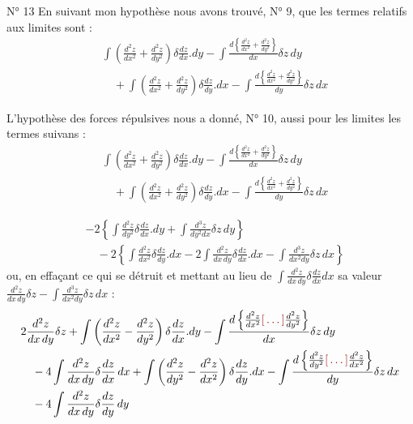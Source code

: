 \documentclass[11pt,a4paper]{article}
\begin{document}
N° 13 En suivant mon hypothèse nous avons trouvé, N° 9, que les termes
relatifs aux limites sont :
\begin{align*}
  &\int \left( \frac{d^{2}z}{dx^{2}} + \frac{d^{2}z}{dy^{2}} \right)
      \delta\frac{dz}{dx} . dy
   - \int \frac{d\left\{ \frac{d^{2}z}{dx^{2}} + \frac{d^{2}z}{dy^{2}} \right\}}{dx}
      \delta z\, dy \\
  &\quad + \int \left( \frac{d^{2}z}{dx^{2}} + \frac{d^{2}z}{dy^{2}} \right)
      \delta\frac{dz}{dy} . dx
   - \int \frac{d\left\{ \frac{d^{2}z}{dx^{2}} + \frac{d^{2}z}{dy^{2}} \right\}}{dy}
      \delta z\, dx
\end{align*}

L'hypothèse des forces répulsives nous a donné, N° 10, aussi pour les limites
les termes suivans :
\begin{align*}
  &\int \left( \frac{d^{2}z}{dx^{2}} + \frac{d^{2}z}{dy^{2}} \right)
      \delta\frac{dz}{dx} . dy
   - \int \frac{d\left\{ \frac{d^{2}z}{dx^{2}} + \frac{d^{2}z}{dy^{2}} \right\}}{dx}
      \delta z\, dy \\
  &\quad + \int \left( \frac{d^{2}z}{dx^{2}} + \frac{d^{2}z}{dy^{2}} \right)
      \delta\frac{dz}{dy} . dx
   - \int \frac{d\left\{ \frac{d^{2}z}{dx^{2}} + \frac{d^{2}z}{dy^{2}} \right\}}{dy}
      \delta z\, dx
\end{align*}

\begin{align*}
  &-2\left\{ \int \frac{d^{2}z}{dy^{2}} \delta\frac{dz}{dx} . dy
     + \int \frac{d^{3}z}{dy^{2}dx} \delta z\, dy \right\} \\
  &\quad - 2\left\{ \int \frac{d^{2}z}{dx^{2}} \delta\frac{dz}{dy} . dx
     - 2\int \frac{d^{2}z}{dx\,dy} \delta\frac{dz}{dx} . dx
     - \int \frac{d^{3}z}{dx^{2}dy} \delta z\, dx \right\}
\end{align*}
ou, en effaçant ce qui se détruit et mettant au lieu de
$\int \frac{d^{2}z}{dx\,dy} \delta\frac{dz}{dx} dx$ sa valeur
$\frac{d^{2}z}{dx\,dy} \delta z - \int \frac{d^{3}z}{dx^{2}dy} \delta z\, dx$ :
\begin{align*}
  &2\frac{d^{2}z}{dx\,dy} \delta z
   + \int \left( \frac{d^{2}z}{dx^{2}} - \frac{d^{2}z}{dy^{2}} \right)
      \delta\frac{dz}{dx} . dy
   - \int \frac{d\left\{ \frac{d^{2}z}{dx^{2}} \ill{} \frac{d^{2}z}{dy^{2}} \right\}}{dx}
      \delta z\, dy \\
  &\quad - 4\int \frac{d^{2}z}{dx\,dy} \delta\frac{dz}{dx}\, dx
   + \int \left( \frac{d^{2}z}{dy^{2}} - \frac{d^{2}z}{dx^{2}} \right)
      \delta\frac{dz}{dy} . dx
   - \int \frac{d\left\{ \frac{d^{2}z}{dy^{2}} \ill{} \frac{d^{2}z}{dx^{2}} \right\}}{dy}
      \delta z\, dx \\
  &\quad - 4\int \frac{d^{2}z}{dx\,dy} \delta\frac{dz}{dy}\, dy
\end{align*}
\end{document}
